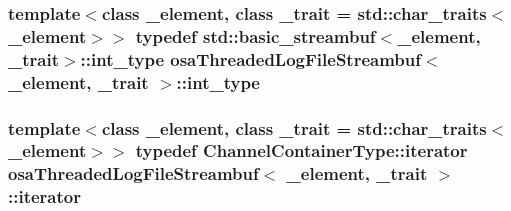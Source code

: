 \hypertarget{classosa_threaded_log_file_streambuf_aac7f3a06c7b5f2824da9634732698e4b}{
\subsubsection[{int\-\_\-type}]{\setlength{\rightskip}{0pt plus 5cm}template$<$class \-\_\-element, class \-\_\-trait = std\-::char\-\_\-traits$<$\-\_\-element$>$$>$ typedef std\-::basic\-\_\-streambuf$<$\-\_\-element, \-\_\-trait$>$\-::{\bf int\-\_\-type} {\bf osa\-Threaded\-Log\-File\-Streambuf}$<$ \-\_\-element, \-\_\-trait $>$\-::{\bf int\-\_\-type}\hspace{0.3cm}{\ttfamily [protected]}}}\label{classosa_threaded_log_file_streambuf_aac7f3a06c7b5f2824da9634732698e4b}
\hypertarget{classosa_threaded_log_file_streambuf_a2f40fd9fa3cc49d0c1adfda883c35fa0}{
\subsubsection[{iterator}]{\setlength{\rightskip}{0pt plus 5cm}template$<$class \-\_\-element, class \-\_\-trait = std\-::char\-\_\-traits$<$\-\_\-element$>$$>$ typedef Channel\-Container\-Type\-::iterator {\bf osa\-Threaded\-Log\-File\-Streambuf}$<$ \-\_\-element, \-\_\-trait $>$\-::{\bf iterator}}}\label{classosa_threaded_log_file_streambuf_a2f40fd9fa3cc49d0c1adfda883c35fa0}


